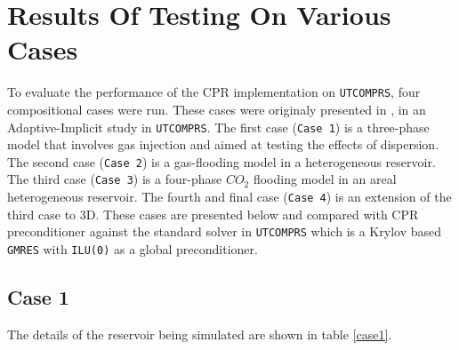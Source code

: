 \chapter{Results Of Testing On Various Cases}
To evaluate the performance of the CPR implementation on \texttt{UTCOMPRS}, four compositional cases were
run. These cases were originaly presented in \cite{fernandes}, in an Adaptive-Implicit study in \texttt{UTCOMPRS}. 
The first case (\texttt{Case 1}) is a three-phase model that involves gas injection and aimed 
at testing the effects of dispersion. The second case (\texttt{Case 2}) is a gas-flooding model in 
a heterogeneous reservoir. The third case (\texttt{Case 3}) is a four-phase $CO_{2}$ flooding model 
in an areal heterogeneous reservoir. The fourth and final case (\texttt{Case 4}) is an extension of
the third case to 3D. These cases are presented below and compared with CPR preconditioner against
the standard solver in \texttt{UTCOMPRS} which is a Krylov based \texttt{GMRES} with \texttt{ILU(0)} as a global
preconditioner. 

\section{Case 1}
The details of the reservoir being simulated are shown in table \ref{case1}. 

